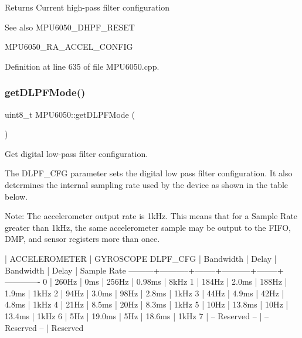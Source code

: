 \begin{DoxyReturn}{Returns}
Current high-\/pass filter configuration 
\end{DoxyReturn}
\begin{DoxySeeAlso}{See also}
M\+P\+U6050\+\_\+\+D\+H\+P\+F\+\_\+\+R\+E\+S\+ET 

M\+P\+U6050\+\_\+\+R\+A\+\_\+\+A\+C\+C\+E\+L\+\_\+\+C\+O\+N\+F\+IG 
\end{DoxySeeAlso}


Definition at line 635 of file M\+P\+U6050.\+cpp.

\mbox{\label{classMPU6050_a9f2737fe22955fd85b2575ba8da874c6}} 
\subsubsection{\texorpdfstring{getDLPFMode()}{getDLPFMode()}}
{\footnotesize\ttfamily uint8\+\_\+t M\+P\+U6050\+::get\+D\+L\+P\+F\+Mode (\begin{DoxyParamCaption}{ }\end{DoxyParamCaption})}



Get digital low-\/pass filter configuration. 

The D\+L\+P\+F\+\_\+\+C\+FG parameter sets the digital low pass filter configuration. It also determines the internal sampling rate used by the device as shown in the table below.

Note\+: The accelerometer output rate is 1k\+Hz. This means that for a Sample Rate greater than 1k\+Hz, the same accelerometer sample may be output to the F\+I\+FO, D\+MP, and sensor registers more than once.


\begin{DoxyPre}
         |   ACCELEROMETER    |           GYROSCOPE
DLPF\_CFG | Bandwidth | Delay  | Bandwidth | Delay  | Sample Rate
---------+-----------+--------+-----------+--------+-------------
0        | 260Hz     | 0ms    | 256Hz     | 0.98ms | 8kHz
1        | 184Hz     | 2.0ms  | 188Hz     | 1.9ms  | 1kHz
2        | 94Hz      | 3.0ms  | 98Hz      | 2.8ms  | 1kHz
3        | 44Hz      | 4.9ms  | 42Hz      | 4.8ms  | 1kHz
4        | 21Hz      | 8.5ms  | 20Hz      | 8.3ms  | 1kHz
5        | 10Hz      | 13.8ms | 10Hz      | 13.4ms | 1kHz
6        | 5Hz       | 19.0ms | 5Hz       | 18.6ms | 1kHz
7        |   -- Reserved --   |   -- Reserved --   | Reserved
\end{DoxyPre}


